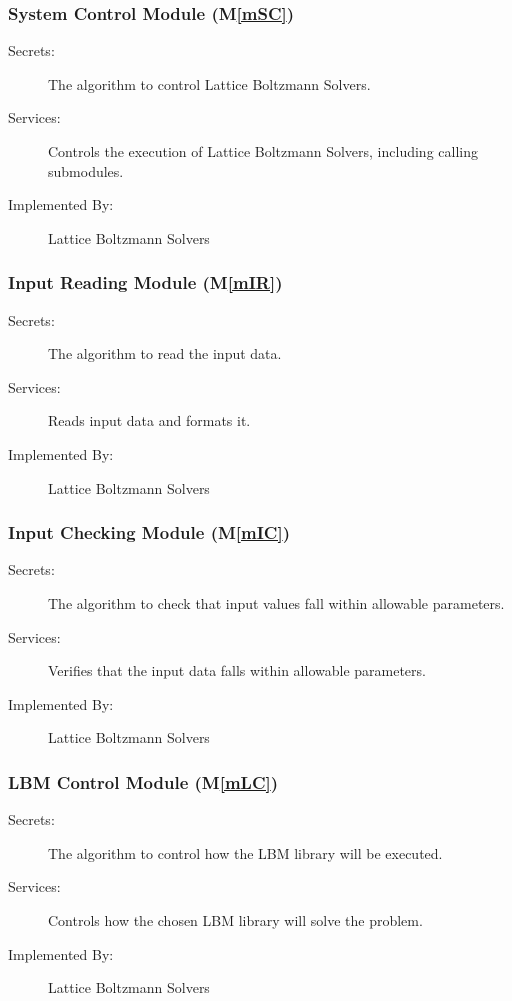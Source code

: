 \documentclass[12pt, titlepage]{article}
\newcommand{\mref}[1]{M\ref{#1}}
\newcommand{\famname}{Lattice Boltzmann Solvers} %
\begin{document}
\subsubsection{System Control Module (\mref{mSC})}

\begin{description}
\item[Secrets:]The algorithm to control \famname .
\item[Services:]Controls the execution of \famname , including calling submodules.
\item[Implemented By:] \famname
\end{description}

\subsubsection{Input Reading Module (\mref{mIR})}

\begin{description}
	\item[Secrets:]The algorithm to read the input data.
	\item[Services:]Reads input data and formats it.
	\item[Implemented By:] \famname
\end{description}

\subsubsection{Input Checking Module (\mref{mIC})}

\begin{description}
	\item[Secrets:]The algorithm to check that input values fall within allowable parameters.
	\item[Services:]Verifies that the input data falls within allowable parameters.
	\item[Implemented By:] \famname
\end{description}

\subsubsection{LBM Control Module (\mref{mLC})}

\begin{description}
	\item[Secrets:]The algorithm to control how the LBM library will be executed.
	\item[Services:]Controls how the chosen LBM library will solve the problem.
	\item[Implemented By:] \famname
\end{description}
\end{document}
